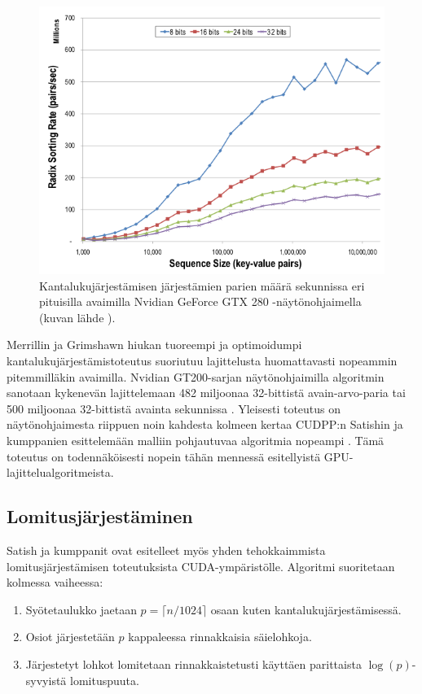\documentclass[a4paper,11pt]{article}
\begin{document}
\begin{figure}
\centering
\includegraphics[scale = 0.45]{radix_sort_varying_key_size}
\caption{Kantalukujärjestämisen järjestämien parien määrä sekunnissa eri pituisilla avaimilla Nvidian GeForce GTX 280 -näytönohjaimella (kuvan lähde \cite{satish2009}).}
\label{fig:radix_sort_varying_key_size}
\end{figure}

Merrillin ja Grimshawn \cite{merrill2010} \cite{merrill2011} hiukan tuoreempi ja optimoidumpi kantalukujärjestämistoteutus suoriutuu lajittelusta huomattavasti nopeammin pitemmilläkin avaimilla. Nvidian GT200-sarjan näytönohjaimilla algoritmin sanotaan kykenevän lajittelemaan 482 miljoonaa 32-bittistä avain-arvo-paria tai 500 miljoonaa 32-bittistä avainta sekunnissa \cite{merrill2010}. Yleisesti toteutus on näytönohjaimesta riippuen noin kahdesta kolmeen kertaa CUDPP:n Satishin ja kumppanien esittelemään malliin pohjautuvaa algoritmia nopeampi \cite{merrill2011}. Tämä toteutus on todennäköisesti nopein tähän mennessä esitellyistä GPU-lajittelualgoritmeista.

\subsection{Lomitusjärjestäminen}

Satish ja kumppanit \cite{satish2009} ovat esitelleet myös yhden tehokkaimmista lomitusjärjestämisen toteutuksista CUDA-ympäristölle. Algoritmi suoritetaan kolmessa vaiheessa:

\begin{singlespace*}
\begin{enumerate}
\item Syötetaulukko jaetaan $p = \lceil n/1024 \rceil$ osaan kuten kantalukujärjestämisessä.
\item Osiot järjestetään $p$ kappaleessa rinnakkaisia säielohkoja.
\item Järjestetyt lohkot lomitetaan rinnakkaistetusti käyttäen parittaista $\log(p)$-syvyistä lomituspuuta.
\end{enumerate}
\end{singlespace*}
\end{document}
